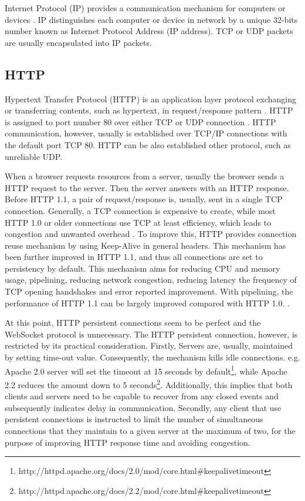Internet Protocol (IP) provides a communication mechanism for computers or devices \cite{postel1981internet}. IP distinguishes each computer or device in network by a unique 32-bits number known as Internet Protocol Address (IP address). TCP or UDP packets are usually encapsulated into IP packets.

\subsection{HTTP}

Hypertext Transfer Protocol (HTTP) is an application layer protocol exchanging or transferring contents, such as hypertext, in request/response pattern \cite{fielding1999hypertext}. HTTP is assigned to port number 80 over either TCP or UDP connection \cite{reynolds1994assigned}. HTTP communication, however, usually is established over TCP/IP connections with the default port TCP 80. HTTP can be also established other protocol, such as unreliable UDP.

When a browser requests resources from a server, usually the browser sends a HTTP request to the server. Then the server answers with an HTTP response. Before HTTP 1.1, a pair of request/response is, usually, sent in a single TCP connection. Generally, a TCP connection is expensive to create, while most HTTP 1.0 or older connections use TCP at least efficiency, which leads to congestion and unwanted overhead \cite{spero1994analysis}.  To improve this, HTTP provides connection reuse mechanism \cite{fieldingrfc} by using Keep-Alive in general headers. This mechanism has been further improved in HTTP 1.1, and thus all connections are set to persistency by default. This mechanism aims for reducing CPU and memory usage, pipelining, reducing network congestion, reducing latency the frequency of TCP opening handshakes and error reported improvement. With pipelining, the performance of HTTP 1.1 can be largely improved compared with HTTP 1.0. \cite{nielsen1997network}. 

At this point, HTTP persistent connections seem to be perfect and the WebSocket protocol is unnecessary. The HTTP persistent connection, however, is restricted by its practical consideration. Firstly, Servers are, usually, maintained by setting time-out value. Consequently, the mechanism kills idle connections. e.g. Apache 2.0 server will set the timeout at 15 seconds by default\footnote{http://httpd.apache.org/docs/2.0/mod/core.html\#keepalivetimeout}, while Apache 2.2 reduces the amount down to 5 seconds\footnote{http://httpd.apache.org/docs/2.2/mod/core.html\#keepalivetimeout}. Additionally, this implies that both clients and servers need to be capable to recover from any closed events and subsequently indicates delay in communication. Secondly, any client that use persistent connections is instructed to limit the number of simultaneous connections that they maintain to a given server at the maximum of two, for the purpose of improving HTTP response time and avoiding congestion. 

